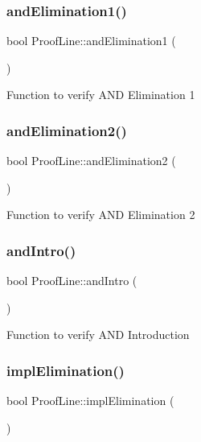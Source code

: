 \subsubsection{\texorpdfstring{and\+Elimination1()}{andElimination1()}}
{\footnotesize\ttfamily bool Proof\+Line\+::and\+Elimination1 (\begin{DoxyParamCaption}{ }\end{DoxyParamCaption})\hspace{0.3cm}{\ttfamily [protected]}}

Function to verify A\+ND Elimination 1 \mbox{\label{classProofLine_a0bda4d97d283bf87f0c97415ede20e37}} 
\subsubsection{\texorpdfstring{and\+Elimination2()}{andElimination2()}}
{\footnotesize\ttfamily bool Proof\+Line\+::and\+Elimination2 (\begin{DoxyParamCaption}{ }\end{DoxyParamCaption})\hspace{0.3cm}{\ttfamily [protected]}}

Function to verify A\+ND Elimination 2 \mbox{\label{classProofLine_ac6f66fe3b8cc3d99b120c6cfc74f34b4}} 
\subsubsection{\texorpdfstring{and\+Intro()}{andIntro()}}
{\footnotesize\ttfamily bool Proof\+Line\+::and\+Intro (\begin{DoxyParamCaption}{ }\end{DoxyParamCaption})\hspace{0.3cm}{\ttfamily [protected]}}

Function to verify A\+ND Introduction \mbox{\label{classProofLine_ae5ea0ef5e9c41064af3d8578af1f8da0}} 
\subsubsection{\texorpdfstring{impl\+Elimination()}{implElimination()}}
{\footnotesize\ttfamily bool Proof\+Line\+::impl\+Elimination (\begin{DoxyParamCaption}{ }\end{DoxyParamCaption})\hspace{0.3cm}{\ttfamily [protected]}}

